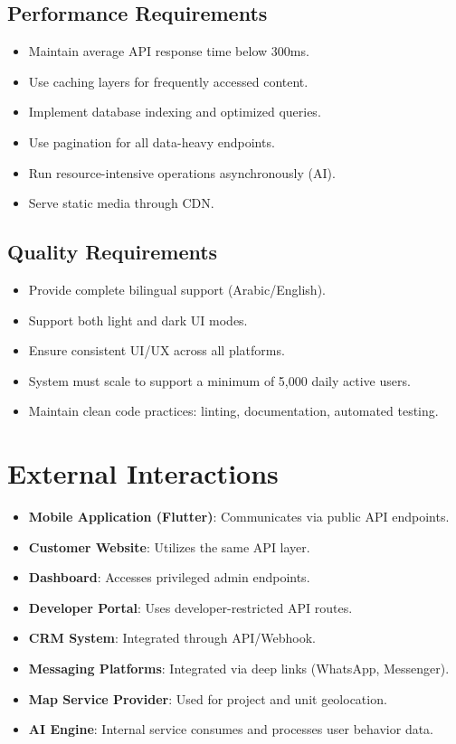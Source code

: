 \documentclass[12pt]{article}
\begin{document}
\subsection{Performance Requirements}
\begin{itemize}
    \item Maintain average API response time below 300ms.
    \item Use caching layers for frequently accessed content.
    \item Implement database indexing and optimized queries.
    \item Use pagination for all data-heavy endpoints.
    \item Run resource-intensive operations asynchronously (AI).
    \item Serve static media through CDN.
\end{itemize}

\subsection{Quality Requirements}
\begin{itemize}
    \item Provide complete bilingual support (Arabic/English).
    \item Support both light and dark UI modes.
    \item Ensure consistent UI/UX across all platforms.
    \item System must scale to support a minimum of 5,000 daily active users.
    \item Maintain clean code practices: linting, documentation, automated testing.
\end{itemize}

\section{External Interactions}

\begin{itemize}
    \item \textbf{Mobile Application (Flutter)}: Communicates via public API endpoints.
    \item \textbf{Customer Website}: Utilizes the same API layer.
    \item \textbf{Dashboard}: Accesses privileged admin endpoints.
    \item \textbf{Developer Portal}: Uses developer-restricted API routes.
    \item \textbf{CRM System}: Integrated through API/Webhook.
    \item \textbf{Messaging Platforms}: Integrated via deep links (WhatsApp, Messenger).
    \item \textbf{Map Service Provider}: Used for project and unit geolocation.
    \item \textbf{AI Engine}: Internal service consumes and processes user behavior data.
\end{itemize}
\end{document}
